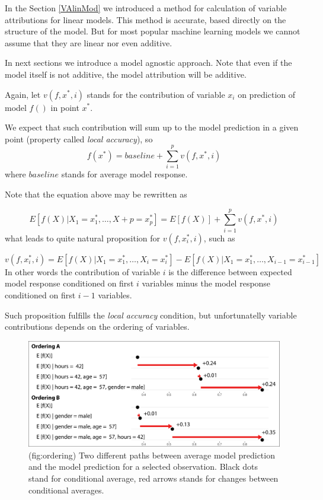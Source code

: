 \documentclass[]{krantz}
\theoremstyle{definition}
\theoremstyle{definition}
\theoremstyle{definition}
\theoremstyle{remark}
\begin{document}
In the Section \ref{VAlinMod} we introduced a method for calculation of
variable attributions for linear models. This method is accurate, based
directly on the structure of the model. But for most popular machine
learning models we cannot assume that they are linear nor even additive.

In next sections we introduce a model agnostic approach. Note that even
if the model itself is not additive, the model attribution will be
additive.

Again, let \(v(f, x^*, i)\) stands for the contribution of variable
\(x_i\) on prediction of model \(f()\) in point \(x^*\).

We expect that such contribution will sum up to the model prediction in
a given point (property called \emph{local accuracy}), so \[
f(x^*) = baseline + \sum_{i=1}^p v(f, x^*, i)
\] where \(baseline\) stands for average model response.

Note that the equation above may be rewritten as

\[
E [f(X)|X_1 = x_1^*, \ldots, X+p = x_p^*] = E[f(X)] + \sum_{i=1}^p v(f, x^*, i)
\] what leads to quite natural proposition for \(v(f, x^*_i, i)\), such
as

\[
v(f, x^*_i, i) = E [f(X) | X_1 = x_1^*, \ldots, X_i = x_i^*] - E [f(X) | X_1 = x_1^*, \ldots, X_{i-1} = x_{i-1}^*] 
\] In other words the contribution of variable \(i\) is the difference
between expected model response conditioned on first \(i\) variables
minus the model response conditioned on first \(i-1\) variables.

Such proposition fulfills the \emph{local accuracy} condition, but
unfortunatelly variable contributions depends on the ordering of
variables.

\begin{figure}

{\centering \includegraphics[width=1\linewidth]{figure/ordering} 

}

\caption{(fig:ordering) Two different paths between average model prediction and the model prediction for a selected observation. Black dots stand for conditional average, red arrows stands for changes between conditional averages.}\label{fig:ordering}
\end{figure}
\end{document}
